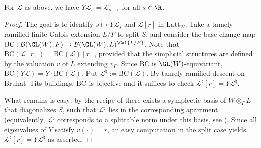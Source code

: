 \documentclass[a4paper,10pt]{article}
\begin{document}
\begin{lemma}\label{prop:Y-translate}
	For $\mathcal{L}$ as above, we have $Y\mathcal{L}_s = \mathcal{L}_{s + r}$ for all $s \in \R$.
\end{lemma}
\begin{proof}
	The goal is to identify $s \mapsto Y\mathcal{L}_s$ and $\mathcal{L}[r]$ in $\text{Latt}_W$. Take a tamely ramified finite Galois extension $L/F$ to split $S$, and consider the base change map $\mathrm{BC}: \mathcal{B}(\GL(W), F) \to \mathcal{B}(\GL(W), L)^{\Gal{L/F}}$. Note that $\text{BC}(\mathcal{L}[r]) = \text{BC}(\mathcal{L})[r]$, provided that the simplicial structures are defined by the valuation $v$ of $L$ extending $v_F$. Since $\text{BC}$ is $\GL(W)$-equivariant, $\text{BC}(Y\mathcal{L}) = Y \cdot \text{BC}(\mathcal{L})$. Put $\mathcal{L}^\natural := \text{BC}(\mathcal{L})$. By tamely ramified descent on Bruhat--Tits buildings, $\text{BC}$ is bijective and it suffices to check $\mathcal{L}^\natural [r] = Y \mathcal{L}^\natural$.
	
	What remains is easy: by the recipe of \cite[Remark 3]{Pra01} there exists a symplectic basis of $W \otimes_F L$ that diagonalizes $S$, such that $\mathcal{L}^\natural$ lies in the corresponding apartment (equivalently, $\mathcal{L}^\natural$ corresponds to a splittable norm under this basis, see \cite[Definition 4.1.2]{LMS16}). Since all eigenvalues of $Y$ satisfy $v(\cdot)=r$, an easy computation in the split case yields $\mathcal{L}^\natural [r] = Y \mathcal{L}^\natural$ as asserted.
\end{proof}
\end{document}
